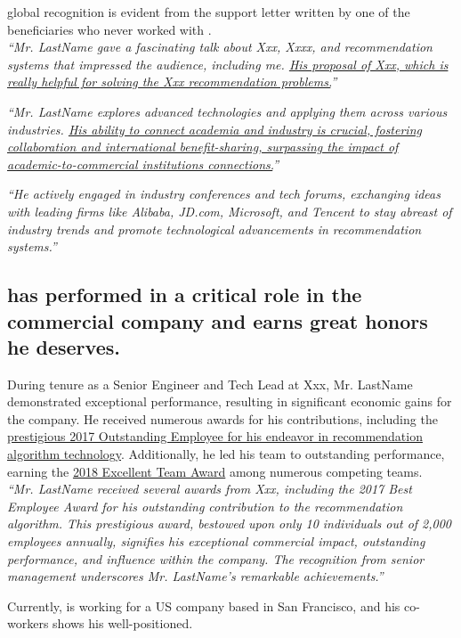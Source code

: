 \documentclass[11pt]{article}
\let\oldenquote\enquote
\renewcommand{\enquote}[1]{{\itshape\oldenquote{#1}}}
\begin{document}
\drs global recognition is evident from the support letter written by one of the beneficiaries who never worked with \dr. \cite{rl_referrer1} \\


\enquote{Mr. LastName gave a fascinating talk about Xxx, Xxxx, and recommendation systems that impressed the audience, including me. \ul{His proposal of Xxx, which is really helpful for solving the Xxx recommendation problems.}} 


\enquote{Mr. LastName explores advanced technologies and applying them across various industries. \ul{His ability to connect academia and industry is crucial, fostering collaboration and international benefit-sharing, surpassing the impact of academic-to-commercial institutions connections.}} 


\enquote{He actively engaged in industry conferences and tech forums, exchanging ideas with leading firms like Alibaba, JD.com, Microsoft, and Tencent to stay abreast of industry trends and promote technological advancements in recommendation systems.} 


\subsection{ \dr has performed in a critical role in the commercial company and earns great honors he deserves.}
\label{honor}

During \drs tenure as a Senior \fie{} Engineer and Tech Lead at Xxx, Mr. LastName demonstrated exceptional performance, resulting in significant economic gains for the company. He received numerous awards for his contributions, including the \ul{prestigious 2017 Outstanding Employee for his endeavor in recommendation algorithm technology}. Additionally, he led his team to outstanding performance, earning the \ul{2018 Excellent Team Award} among numerous competing teams. \cite{honor} \\


\enquote{Mr. LastName received several awards from Xxx, including the 2017 Best Employee Award for his outstanding contribution to the recommendation algorithm. This prestigious award, bestowed upon only 10 individuals out of 2,000 employees annually, signifies his exceptional commercial impact, outstanding performance, and influence within the company. The recognition from senior management underscores Mr. LastName's remarkable achievements.} 

Currently, \dr is working for a US company based in San Francisco, and his co-workers shows his well-positioned. \\
\end{document}
